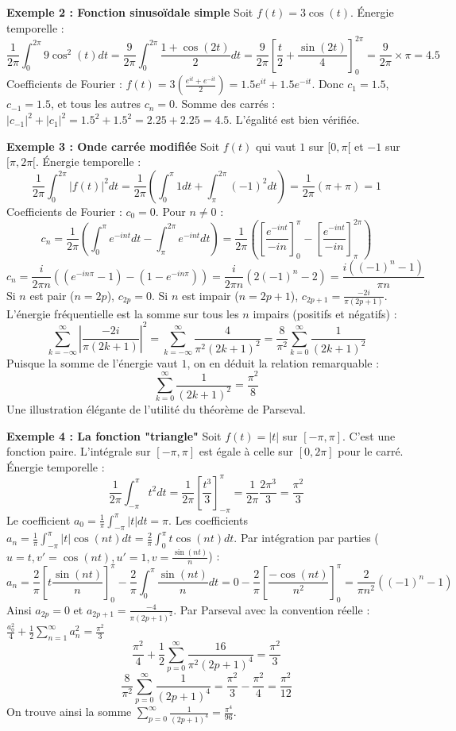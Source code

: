\documentclass[11pt,a4paper]{article}
\begin{document}
\textbf{Exemple 2 : Fonction sinusoïdale simple}
Soit $f(t) = 3 \cos(t)$.
Énergie temporelle :
$$\frac{1}{2\pi} \int_0^{2\pi} 9 \cos^2(t) dt = \frac{9}{2\pi} \int_0^{2\pi} \frac{1 + \cos(2t)}{2} dt = \frac{9}{2\pi} \left[ \frac{t}{2} + \frac{\sin(2t)}{4} \right]_0^{2\pi} = \frac{9}{2\pi} \times \pi = 4.5$$
Coefficients de Fourier : $f(t) = 3 \left(\frac{e^{it} + e^{-it}}{2}\right) = 1.5 e^{it} + 1.5 e^{-it}$.
Donc $c_1 = 1.5$, $c_{-1} = 1.5$, et tous les autres $c_n = 0$.
Somme des carrés : $|c_{-1}|^2 + |c_1|^2 = 1.5^2 + 1.5^2 = 2.25 + 2.25 = 4.5$.
L'égalité est bien vérifiée.

\textbf{Exemple 3 : Onde carrée modifiée}
Soit $f(t)$ qui vaut $1$ sur $[0, \pi[$ et $-1$ sur $[\pi, 2\pi[$.
Énergie temporelle :
$$\frac{1}{2\pi} \int_0^{2\pi} |f(t)|^2 dt = \frac{1}{2\pi} \left( \int_0^{\pi} 1 dt + \int_{\pi}^{2\pi} (-1)^2 dt \right) = \frac{1}{2\pi} (\pi + \pi) = 1$$
Coefficients de Fourier :
$c_0 = 0$. Pour $n \neq 0$ :
$$c_n = \frac{1}{2\pi} \left( \int_0^{\pi} e^{-int} dt - \int_{\pi}^{2\pi} e^{-int} dt \right) = \frac{1}{2\pi} \left( \left[ \frac{e^{-int}}{-in} \right]_0^\pi - \left[ \frac{e^{-int}}{-in} \right]_\pi^{2\pi} \right)$$
$$c_n = \frac{i}{2\pi n} \left( (e^{-in\pi} - 1) - (1 - e^{-in\pi}) \right) = \frac{i}{2\pi n} (2(-1)^n - 2) = \frac{i( (-1)^n - 1 )}{\pi n}$$
Si $n$ est pair ($n=2p$), $c_{2p} = 0$.
Si $n$ est impair ($n=2p+1$), $c_{2p+1} = \frac{-2i}{\pi(2p+1)}$.
L'énergie fréquentielle est la somme sur tous les $n$ impairs (positifs et négatifs) :
$$\sum_{k=-\infty}^\infty \left| \frac{-2i}{\pi(2k+1)} \right|^2 = \sum_{k=-\infty}^\infty \frac{4}{\pi^2 (2k+1)^2} = \frac{8}{\pi^2} \sum_{k=0}^\infty \frac{1}{(2k+1)^2}$$
Puisque la somme de l'énergie vaut $1$, on en déduit la relation remarquable :
$$\sum_{k=0}^\infty \frac{1}{(2k+1)^2} = \frac{\pi^2}{8}$$
Une illustration élégante de l'utilité du théorème de Parseval.

\textbf{Exemple 4 : La fonction "triangle"}
Soit $f(t) = |t|$ sur $[-\pi, \pi]$. C'est une fonction paire. L'intégrale sur $[-\pi, \pi]$ est égale à celle sur $[0, 2\pi]$ pour le carré.
Énergie temporelle :
$$\frac{1}{2\pi} \int_{-\pi}^\pi t^2 dt = \frac{1}{2\pi} \left[ \frac{t^3}{3} \right]_{-\pi}^\pi = \frac{1}{2\pi} \frac{2\pi^3}{3} = \frac{\pi^2}{3}$$
Le coefficient $a_0 = \frac{1}{\pi} \int_{-\pi}^\pi |t| dt = \pi$.
Les coefficients $a_n = \frac{1}{\pi} \int_{-\pi}^\pi |t| \cos(nt) dt = \frac{2}{\pi} \int_0^\pi t \cos(nt) dt$. Par intégration par parties ($u=t, v'=\cos(nt), u'=1, v=\frac{\sin(nt)}{n}$) :
$$a_n = \frac{2}{\pi} \left[ t \frac{\sin(nt)}{n} \right]_0^\pi - \frac{2}{\pi} \int_0^\pi \frac{\sin(nt)}{n} dt = 0 - \frac{2}{\pi} \left[ \frac{-\cos(nt)}{n^2} \right]_0^\pi = \frac{2}{\pi n^2} ((-1)^n - 1)$$
Ainsi $a_{2p} = 0$ et $a_{2p+1} = \frac{-4}{\pi(2p+1)^2}$.
Par Parseval avec la convention réelle : $\frac{a_0^2}{4} + \frac{1}{2} \sum_{n=1}^\infty a_n^2 = \frac{\pi^2}{3}$
$$\frac{\pi^2}{4} + \frac{1}{2} \sum_{p=0}^\infty \frac{16}{\pi^2(2p+1)^4} = \frac{\pi^2}{3}$$
$$\frac{8}{\pi^2} \sum_{p=0}^\infty \frac{1}{(2p+1)^4} = \frac{\pi^2}{3} - \frac{\pi^2}{4} = \frac{\pi^2}{12}$$
On trouve ainsi la somme $\sum_{p=0}^\infty \frac{1}{(2p+1)^4} = \frac{\pi^4}{96}$.
\end{document}
